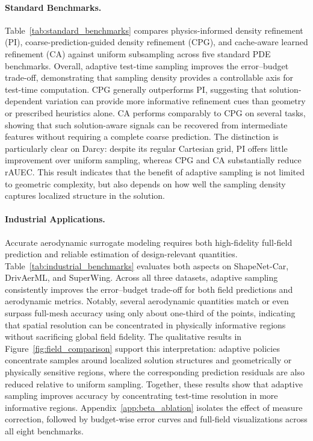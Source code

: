 \paragraph{Standard Benchmarks.}
Table~\ref{tab:standard_benchmarks} compares physics-informed density
refinement (PI), coarse-prediction-guided density refinement (CPG), and
cache-aware learned refinement (CA) against uniform subsampling across five
standard PDE benchmarks. Overall, adaptive test-time sampling improves the
error--budget trade-off, demonstrating that sampling density provides a
controllable axis for test-time computation. CPG generally outperforms PI,
suggesting that solution-dependent variation can provide more informative
refinement cues than geometry or prescribed heuristics alone. CA performs
comparably to CPG on several tasks, showing that such solution-aware signals
can be recovered from intermediate features without requiring a complete
coarse prediction. The distinction is particularly clear on Darcy: despite its
regular Cartesian grid, PI offers little improvement over uniform sampling,
whereas CPG and CA substantially reduce rAUEC. This result indicates that the
benefit of adaptive sampling is not limited to geometric complexity, but also
depends on how well the sampling density captures localized structure in the
solution.



\paragraph{Industrial Applications.}
Accurate aerodynamic surrogate modeling requires both high-fidelity full-field
prediction and reliable estimation of design-relevant quantities. Table~\ref{tab:industrial_benchmarks} evaluates both aspects on
ShapeNet-Car, DrivAerML, and SuperWing. Across all three datasets, adaptive
sampling consistently improves the error--budget trade-off for both field
predictions and aerodynamic metrics. Notably, several aerodynamic quantities
match or even surpass full-mesh accuracy using only about one-third of the
points, indicating that spatial resolution can be concentrated in physically
informative regions without sacrificing global field fidelity. The qualitative
results in Figure~\ref{fig:field_comparison} support this interpretation:
adaptive policies concentrate samples around localized solution structures and
geometrically or physically sensitive regions, where the corresponding
prediction residuals are also reduced relative to uniform sampling. Together, these results show that adaptive sampling improves accuracy by concentrating test-time resolution in more informative regions. Appendix~\ref{app:beta_ablation} isolates the effect of measure correction,
followed by budget-wise error curves and full-field visualizations across all eight benchmarks.


